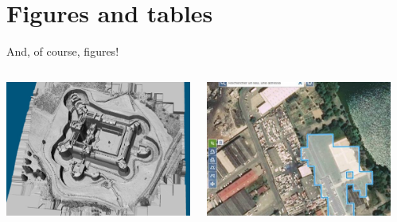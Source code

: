 \documentclass[11pt,aspectratio=169]{beamer}
\begin{document}
\section{Figures and tables}
\begin{frame}{And, of course, figures!}

	\begin{columns}
		\begin{column}{0.33\textwidth}
			\includegraphics[width=\columnwidth]{example-image-1}
		\end{column}
		\begin{column}{0.33\textwidth}
			\includegraphics[width=\columnwidth]{example-image-2}
		\end{column}
		\begin{column}{0.33\textwidth}

\end{column}
\end{columns}
\end{frame}
\end{document}
